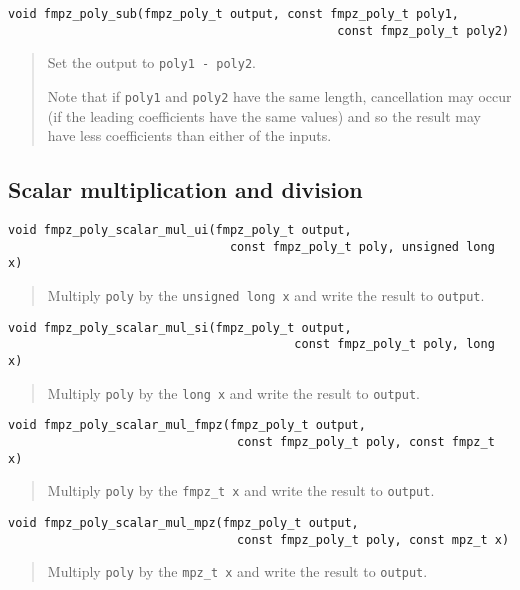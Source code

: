 \documentclass[a4paper,10pt]{article}
\newcommand{\code}{\lstinline}
\begin{document}
\begin{lstlisting}
void fmpz_poly_sub(fmpz_poly_t output, const fmpz_poly_t poly1, 
                                              const fmpz_poly_t poly2) 
\end{lstlisting}
\begin{quote}
Set the output to \code{poly1 - poly2}. 

Note that if \code{poly1} and \code{poly2} have the same length, cancellation may occur (if the leading coefficients have the same values) and so the result may have less coefficients than either of the inputs. 
\end{quote}

\subsection{Scalar multiplication and division}

\begin{lstlisting}
void fmpz_poly_scalar_mul_ui(fmpz_poly_t output, 
                               const fmpz_poly_t poly, unsigned long x)
\end{lstlisting}
\begin{quote}
Multiply \code{poly} by the \code{unsigned long x} and write the result to \code{output}. 
\end{quote}

\begin{lstlisting}
void fmpz_poly_scalar_mul_si(fmpz_poly_t output, 
                                        const fmpz_poly_t poly, long x)
\end{lstlisting}
\begin{quote}
Multiply \code{poly} by the \code{long x} and write the result to \code{output}. 
\end{quote}

\begin{lstlisting}
void fmpz_poly_scalar_mul_fmpz(fmpz_poly_t output, 
                                const fmpz_poly_t poly, const fmpz_t x) 
\end{lstlisting}
\begin{quote}
Multiply \code{poly} by the \code{fmpz_t x} and write the result to \code{output}. 
\end{quote}

\begin{lstlisting}
void fmpz_poly_scalar_mul_mpz(fmpz_poly_t output, 
                                const fmpz_poly_t poly, const mpz_t x) 
\end{lstlisting}
\begin{quote}
Multiply \code{poly} by the \code{mpz_t x} and write the result to \code{output}. 
\end{quote}
\end{document}
